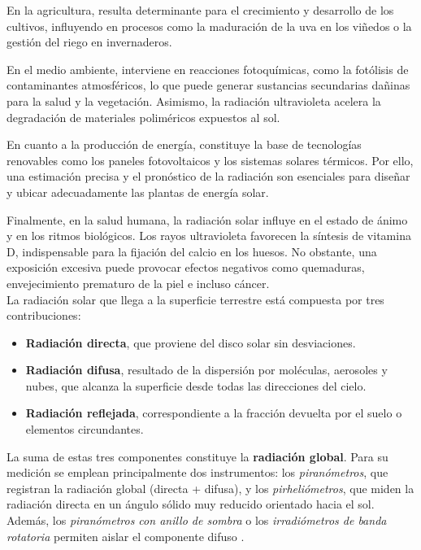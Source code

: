 En la agricultura, resulta determinante para el crecimiento y desarrollo de los cultivos, influyendo en procesos como la maduración de la uva en los viñedos o la gestión del riego en invernaderos.

En el medio ambiente, interviene en reacciones fotoquímicas, como la fotólisis de contaminantes atmosféricos, lo que puede generar sustancias secundarias dañinas para la salud y la vegetación. Asimismo, la radiación ultravioleta acelera la degradación de materiales poliméricos expuestos al sol.

En cuanto a la producción de energía, constituye la base de tecnologías renovables como los paneles fotovoltaicos y los sistemas solares térmicos. Por ello, una estimación precisa y el pronóstico de la radiación son esenciales para diseñar y ubicar adecuadamente las plantas de energía solar.

Finalmente, en la salud humana, la radiación solar influye en el estado de ánimo y en los ritmos biológicos. Los rayos ultravioleta favorecen la síntesis de vitamina D, indispensable para la fijación del calcio en los huesos. No obstante, una exposición excesiva puede provocar efectos negativos como quemaduras, envejecimiento prematuro de la piel e incluso cáncer.\\


La radiación solar que llega a la superficie terrestre está compuesta por tres contribuciones:  
\begin{itemize}
    \item \textbf{Radiación directa}, que proviene del disco solar sin desviaciones.  
    \item \textbf{Radiación difusa}, resultado de la dispersión por moléculas, aerosoles y nubes, que alcanza la superficie desde todas las direcciones del cielo.  
    \item \textbf{Radiación reflejada}, correspondiente a la fracción devuelta por el suelo o elementos circundantes.  
\end{itemize}

La suma de estas tres componentes constituye la \textbf{radiación global}. Para su medición se emplean principalmente dos instrumentos: los \textit{piranómetros}, que registran la radiación global (directa + difusa), y los \textit{pirheliómetros}, que miden la radiación directa en un ángulo sólido muy reducido orientado hacia el sol. Además, los \textit{piranómetros con anillo de sombra} o los \textit{irradiómetros de banda rotatoria} permiten aislar el componente difuso \citep{duffie2013}.  

